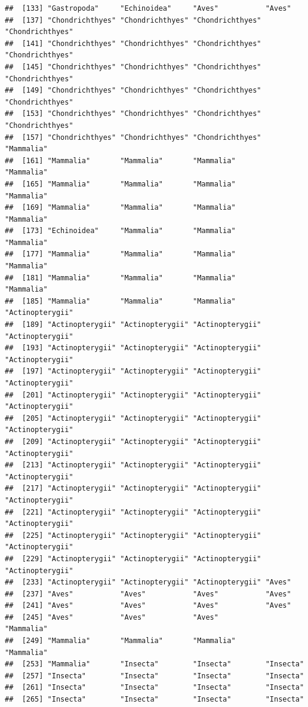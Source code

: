 \documentclass[
]{article}
\begin{document}
\begin{verbatim}
##  [133] "Gastropoda"     "Echinoidea"     "Aves"           "Aves"          
##  [137] "Chondrichthyes" "Chondrichthyes" "Chondrichthyes" "Chondrichthyes"
##  [141] "Chondrichthyes" "Chondrichthyes" "Chondrichthyes" "Chondrichthyes"
##  [145] "Chondrichthyes" "Chondrichthyes" "Chondrichthyes" "Chondrichthyes"
##  [149] "Chondrichthyes" "Chondrichthyes" "Chondrichthyes" "Chondrichthyes"
##  [153] "Chondrichthyes" "Chondrichthyes" "Chondrichthyes" "Chondrichthyes"
##  [157] "Chondrichthyes" "Chondrichthyes" "Chondrichthyes" "Mammalia"      
##  [161] "Mammalia"       "Mammalia"       "Mammalia"       "Mammalia"      
##  [165] "Mammalia"       "Mammalia"       "Mammalia"       "Mammalia"      
##  [169] "Mammalia"       "Mammalia"       "Mammalia"       "Mammalia"      
##  [173] "Echinoidea"     "Mammalia"       "Mammalia"       "Mammalia"      
##  [177] "Mammalia"       "Mammalia"       "Mammalia"       "Mammalia"      
##  [181] "Mammalia"       "Mammalia"       "Mammalia"       "Mammalia"      
##  [185] "Mammalia"       "Mammalia"       "Mammalia"       "Actinopterygii"
##  [189] "Actinopterygii" "Actinopterygii" "Actinopterygii" "Actinopterygii"
##  [193] "Actinopterygii" "Actinopterygii" "Actinopterygii" "Actinopterygii"
##  [197] "Actinopterygii" "Actinopterygii" "Actinopterygii" "Actinopterygii"
##  [201] "Actinopterygii" "Actinopterygii" "Actinopterygii" "Actinopterygii"
##  [205] "Actinopterygii" "Actinopterygii" "Actinopterygii" "Actinopterygii"
##  [209] "Actinopterygii" "Actinopterygii" "Actinopterygii" "Actinopterygii"
##  [213] "Actinopterygii" "Actinopterygii" "Actinopterygii" "Actinopterygii"
##  [217] "Actinopterygii" "Actinopterygii" "Actinopterygii" "Actinopterygii"
##  [221] "Actinopterygii" "Actinopterygii" "Actinopterygii" "Actinopterygii"
##  [225] "Actinopterygii" "Actinopterygii" "Actinopterygii" "Actinopterygii"
##  [229] "Actinopterygii" "Actinopterygii" "Actinopterygii" "Actinopterygii"
##  [233] "Actinopterygii" "Actinopterygii" "Actinopterygii" "Aves"          
##  [237] "Aves"           "Aves"           "Aves"           "Aves"          
##  [241] "Aves"           "Aves"           "Aves"           "Aves"          
##  [245] "Aves"           "Aves"           "Aves"           "Mammalia"      
##  [249] "Mammalia"       "Mammalia"       "Mammalia"       "Mammalia"      
##  [253] "Mammalia"       "Insecta"        "Insecta"        "Insecta"       
##  [257] "Insecta"        "Insecta"        "Insecta"        "Insecta"       
##  [261] "Insecta"        "Insecta"        "Insecta"        "Insecta"       
##  [265] "Insecta"        "Insecta"        "Insecta"        "Insecta"       

\end{verbatim}
\end{document}
